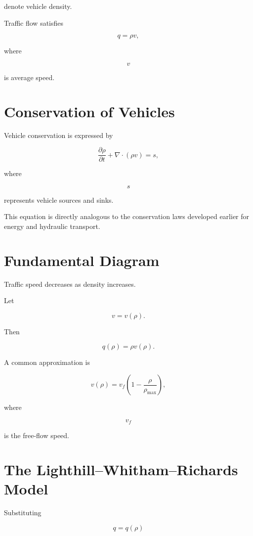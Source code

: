 \documentclass[11pt,fleqn]{book}
\numberwithin{equation}{chapter}
\theoremstyle{plain}
\theoremstyle{definition}
\theoremstyle{remark}
\begin{document}
denote vehicle density.

Traffic flow satisfies

\[
q=\rho v,
\]

where

\[
v
\]

is average speed.


\section{Conservation of Vehicles}

Vehicle conservation is expressed by

\[
\boxed{
\frac{\partial\rho}{\partial t}
+
\nabla\cdot(\rho v)
=
s,
}
\]

where

\[
s
\]

represents vehicle sources and sinks.

This equation is directly analogous to the conservation laws developed
earlier for energy and hydraulic transport.


\section{Fundamental Diagram}

Traffic speed decreases as density increases.

Let

\[
v=v(\rho).
\]

Then

\[
q(\rho)
=
\rho v(\rho).
\]

A common approximation is

\[
v(\rho)
=
v_f
\left(
1-
\frac{\rho}{\rho_{\max}}
\right),
\]

where

\[
v_f
\]

is the free-flow speed.


\section{The Lighthill--Whitham--Richards Model}

Substituting

\[
q=q(\rho)
\]
\end{document}
